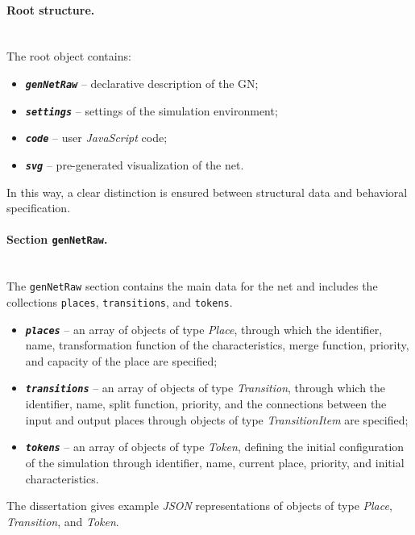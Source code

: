 	\paragraph{Root structure.}\mbox{}\\
	The root object contains:
	\begin{itemize}
		\item \texttt{\textbf{\textit{genNetRaw}}} -- declarative description of the GN;
		\item \texttt{\textbf{\textit{settings}}} -- settings of the simulation environment;
		\item \texttt{\textbf{\textit{code}}} -- user \textit{JavaScript} code;
		\item \texttt{\textbf{\textit{svg}}} -- pre-generated visualization of the net.
	\end{itemize}
	
	In this way, a clear distinction is ensured between structural data and behavioral specification.
	
	\paragraph{Section \texttt{genNetRaw}.}\mbox{}\\
	The \texttt{genNetRaw} section contains the main data for the net and includes the collections \texttt{places}, \texttt{transitions}, and \texttt{tokens}.
	
	\begin{itemize}
		\item \texttt{\textbf{\textit{places}}} -- an array of objects of type \textit{Place}, through which the identifier, name, transformation function of the characteristics, merge function, priority, and capacity of the place are specified;
		\item \texttt{\textbf{\textit{transitions}}} -- an array of objects of type \textit{Transition}, through which the identifier, name, split function, priority, and the connections between the input and output places through objects of type \textit{TransitionItem} are specified;
		\item \texttt{\textbf{\textit{tokens}}} -- an array of objects of type \textit{Token}, defining the initial configuration of the simulation through identifier, name, current place, priority, and initial characteristics.
	\end{itemize}
	
	The dissertation gives example \textit{JSON} representations of objects of type \textit{Place}, \textit{Transition}, and \textit{Token}.
	

